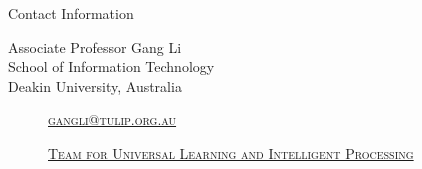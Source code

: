 \documentclass[
 size=14pt,
 paper=smartboard,  %
 mode=present, 		%
 display=slides, 	%
 style=tuliplab,  	%
 pauseslide,
 fleqn,leqno]{powerdot}{}
\begin{document}
\begin{wideslide}[toc=,bm=]{Contact Information}
\centering
{}
\twocolumn[
lcolwidth=0.35\linewidth,
rcolwidth=0.65\linewidth
]
{
}
{
Associate Professor Gang Li\\
School of Information Technology\\
Deakin University, Australia
\begin{description}
 \item[\textcolor{orange}{\faEnvelope}] \href{mailto:gangli@tulip.org.au}
 {\textsc{\footnotesize{gangli@tulip.org.au}}}

 \item[\textcolor{orange}{\faHome}] \href{http://www.tulip.org.au}
 {\textsc{\footnotesize{Team for Universal Learning and Intelligent Processing}}}
\end{description}
}
\end{wideslide}
\end{document}
